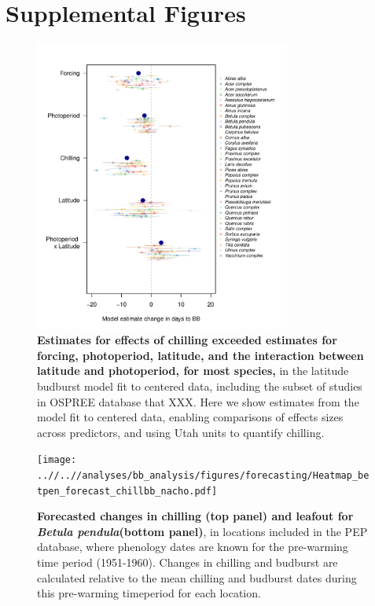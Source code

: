\documentclass{article}
\begin{document}
% 
\newpage

\newpage
\section* {Supplemental Figures}

\newpage
\begin{figure}[h!]
\centering
\noindent \includegraphics[width=0.75\textwidth]{..//..//analyses/lat_analysis/figures/latanalysis_spcom_expramp_fp.pdf}
\caption{\textbf{Estimates for effects of chilling exceeded estimates for forcing, photoperiod, latitude, and the interaction between latitude and photoperiod, for most species,} in the latitude budburst model fit to centered data, including the subset of studies in OSPREE database that XXX. Here we show estimates from the model fit to centered data, enabling comparisons of effects sizes across predictors, and using Utah units to quantify chilling.}
\label{fig:lat}
\end{figure}

\begin{figure}[h!]
\centering
\noindent \texttt{[image: ..//..//analyses/bb\_analysis/figures/forecasting/Heatmap\_betpen\_forecast\_chillbb\_nacho.pdf]}
\caption{\textbf{Forecasted changes in chilling (top panel) and leafout for \emph{Betula pendula}(bottom panel)}, in locations included in the PEP database, where phenology dates are known for the pre-warming time period (1951-1960). Changes in chilling and budburst are calculated relative to the mean chilling and budburst dates during this pre-warming timeperiod for each location.} 
\label{fig:foremap}
\end{figure}
\end{document}
